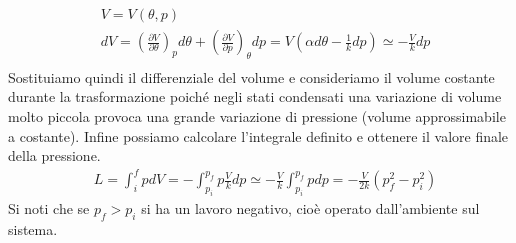 \documentclass[
10pt, %
a4paper, %
oneside, %
headinclude,footinclude, %
BCOR5mm, %
]{scrartcl}
\begin{document}
\begin{enumerate}
	\begin{align*} 
		&V = V(\theta, p)\\
		&dV = \left(\frac{\partial V}{\partial \theta}\right)_p d\theta + \left(\frac{\partial V}{\partial p}\right)_{\theta} dp = V(\alpha d\theta-\frac{1}{k} dp)\simeq-\frac{V}{k}dp\\
	\end{align*}  
	Sostituiamo quindi il differenziale del volume e consideriamo il volume costante durante la trasformazione poiché negli stati condensati una variazione di volume molto piccola provoca una grande variazione di pressione (volume approssimabile a costante). Infine possiamo calcolare l'integrale definito e ottenere il valore finale della pressione. 
	\begin{align*} 
		&L=\int_{i}^{f}pdV = -\int_{p_i}^{p_f}p\frac{V}{k}dp \simeq -\frac{V}{k}\int_{p_i}^{p_f}pdp = -\frac{V}{2k}\left(p_f^2-p_i^2\right)
	\end{align*} 
	Si noti che se $p_f > p_i$ si ha un lavoro negativo, cioè operato dall'ambiente sul sistema. 
\end{enumerate}
\end{document}
